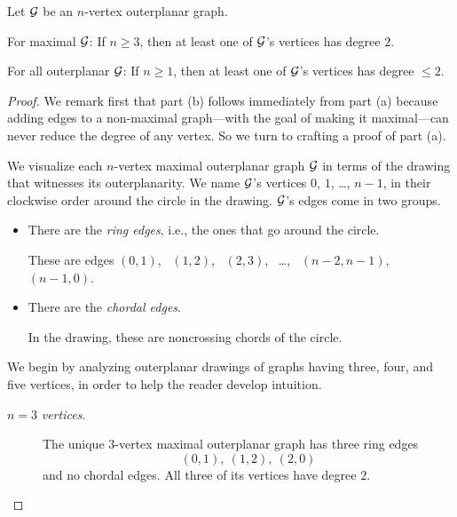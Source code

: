 
\begin{lemma}
\label{thm:outerplanar-deg2}
Let $\mbox{$\cal G$}$ be an $n$-vertex outerplanar graph.

\smallskip

For maximal $\mbox{$\cal G$}$: If $n \geq 3$, then at least one of $\mbox{$\cal G$}$'s vertices has degree $2$.

\smallskip

For all outerplanar $\mbox{$\cal G$}$: If $n \geq 1$, then at least one of $\mbox{$\cal G$}$'s vertices has degree $\leq 2$.
\end{lemma}

\begin{proof}
We remark first that part (b) follows immediately from part (a) because adding edges to a non-maximal graph---with the goal of making it maximal---can never reduce the degree of any vertex.  
So we turn to crafting a proof of part (a).

\medskip

We visualize each $n$-vertex maximal outerplanar graph $\mbox{$\cal G$}$ in terms of the drawing that witnesses its outerplanarity.  We name $\mbox{$\cal G$}$'s vertices $0$, $1$, \ldots, $n-1$, in their clockwise order around the circle in the drawing.  $\mbox{$\cal G$}$'s edges come in two groups.
\begin{itemize}
\item
There are the {\em ring edges}, i.e., the ones that go around the circle.

\smallskip

These are edges $(0,1)$, \ $(1,2)$, \ $(2,3)$, \ \ldots, \ $(n-2, n-1)$, \ $(n-1, 0)$. 

\medskip\item
There are the {\em chordal edges}.

\smallskip
In the drawing, these are noncrossing chords of the circle.
\end{itemize}

\smallskip

We begin by analyzing outerplanar drawings of graphs having three, four, and five vertices, in order to help the reader develop intuition.
\begin{description}
\item[$n=3$ {\em vertices}.]
The unique $3$-vertex maximal outerplanar graph has three ring edges
\[ (0,1), \ (1,2), \ (2,0) \]
and no chordal edges.  All three of its vertices have degree $2$.


\end{description}
\end{proof}
